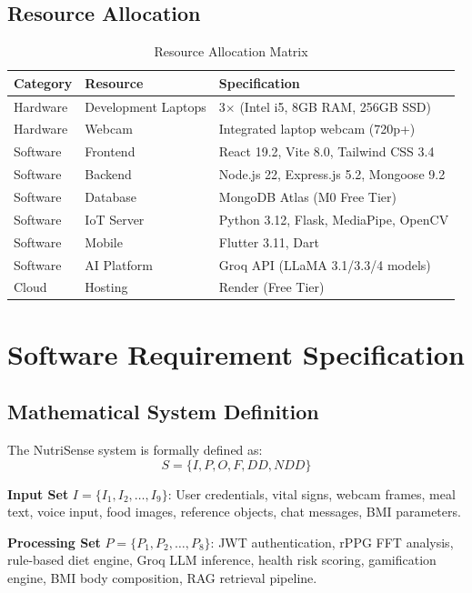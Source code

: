 \documentclass[12pt,a4paper]{report}
\begin{document}
\section{Resource Allocation}
\begin{table}[H]
\centering
\caption{Resource Allocation Matrix}
\label{tab:resources}
\begin{tabular}{|l|l|l|}
\hline
\textbf{Category} & \textbf{Resource} & \textbf{Specification} \\
\hline
Hardware & Development Laptops & 3$\times$ (Intel i5, 8GB RAM, 256GB SSD) \\
Hardware & Webcam & Integrated laptop webcam (720p+) \\
Software & Frontend & React 19.2, Vite 8.0, Tailwind CSS 3.4 \\
Software & Backend & Node.js 22, Express.js 5.2, Mongoose 9.2 \\
Software & Database & MongoDB Atlas (M0 Free Tier) \\
Software & IoT Server & Python 3.12, Flask, MediaPipe, OpenCV \\
Software & Mobile & Flutter 3.11, Dart \\
Software & AI Platform & Groq API (LLaMA 3.1/3.3/4 models) \\
Cloud & Hosting & Render (Free Tier) \\
\hline
\end{tabular}
\end{table}

\chapter{Software Requirement Specification}

\section{Mathematical System Definition}
The NutriSense system is formally defined as:
\begin{equation}
S = \{I, P, O, F, DD, NDD\}
\end{equation}

\textbf{Input Set} $I = \{I_1, I_2, \ldots, I_9\}$: User credentials, vital signs, webcam frames, meal text, voice input, food images, reference objects, chat messages, BMI parameters.

\textbf{Processing Set} $P = \{P_1, P_2, \ldots, P_8\}$: JWT authentication, rPPG FFT analysis, rule-based diet engine, Groq LLM inference, health risk scoring, gamification engine, BMI body composition, RAG retrieval pipeline.
\end{document}
